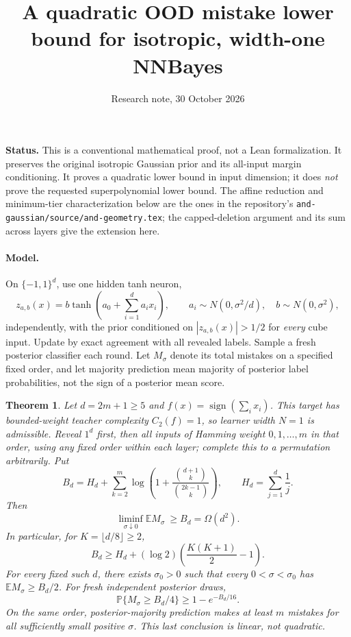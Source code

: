 \documentclass[11pt]{article}
\title{A quadratic OOD mistake lower bound for isotropic, width-one NNBayes}
\author{Research note, 30 October 2026}
\date{}
\newtheorem{theorem}{Theorem}
\newcommand{\sgn}{\operatorname{sign}}
\begin{document}
\maketitle
\noindent\textbf{Status.} This is a conventional mathematical proof, not a Lean formalization. It preserves the original isotropic Gaussian prior and its all-input margin conditioning. It proves a quadratic lower bound in input dimension; it does \emph{not} prove the requested superpolynomial lower bound. The affine reduction and minimum-tier characterization below are the ones in the repository's \texttt{and-gaussian/source/and-geometry.tex}; the capped-deletion argument and its sum across layers give the extension here.

\paragraph{Model.}
On $\{-1,1\}^d$, use one hidden tanh neuron,
\[
 z_{a,b}(x)=b\tanh(a_0+\sum_{i=1}^d a_ix_i),\qquad
 a_i\sim N(0,\sigma^2/d),\quad b\sim N(0,\sigma^2),
\]
independently, with the prior conditioned on $|z_{a,b}(x)|>1/2$ for \emph{every} cube input. Update by exact agreement with all revealed labels. Sample a fresh posterior classifier each round. Let $M_\sigma$ denote its total mistakes on a specified fixed order, and let majority prediction mean majority of posterior label probabilities, not the sign of a posterior mean score.

\begin{theorem}\label{thm:main}
Let $d=2m+1\ge5$ and $f(x)=\sgn(\sum_i x_i)$. This target has bounded-weight teacher complexity $C_2(f)=1$, so learner width $N=1$ is admissible. Reveal $1^d$ first, then all inputs of Hamming weight $0,1,\ldots,m$ in that order, using any fixed order within each layer; complete this to a permutation arbitrarily. Put
\[
 B_d=H_d+\sum_{k=2}^{m}\log\!\left(1+
       \frac{\binom{d+1}{k}}{\binom{2k-1}{k}}\right),
 \qquad H_d=\sum_{j=1}^d\frac1j.
\]
Then
\[
 \liminf_{\sigma\downarrow0}\mathbb E M_\sigma\ \ge B_d=\Omega(d^2).
\]
In particular, for $K=\lfloor d/8\rfloor\ge2$,
\[
 B_d\ge H_d+(\log2)\left(\frac{K(K+1)}2-1\right).
\]
For every fixed such $d$, there exists $\sigma_0>0$ such that every $0<\sigma<\sigma_0$ has $\mathbb E M_\sigma\ge B_d/2$. For fresh independent posterior draws,
\[
 \mathbb P\{M_\sigma\ge B_d/4\}\ge1-e^{-B_d/16}.
\]
On the same order, posterior-majority prediction makes at least $m$ mistakes for all sufficiently small positive $\sigma$. This last conclusion is linear, not quadratic.
\end{theorem}
\end{document}
